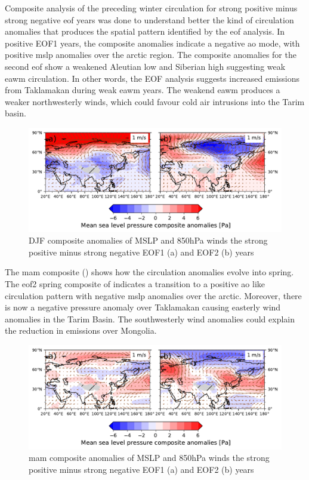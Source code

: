 Composite analysis of the preceding winter circulation for strong positive minus strong negative \acrshort{eof} years was done to understand better the kind of circulation anomalies that produces the spatial pattern identified by the \acrshort{eof} analysis. 
In positive EOF1 years, the composite anomalies indicate a negative \acrshort{ao} mode, with positive \acrshort{mslp} anomalies over the arctic region.
The composite anomalies for the second \acrshort{eof} show a weakened Aleutian low and Siberian high suggesting weak \acrshort{eawm} circulation.
In other words, the EOF analysis suggests increased emissions from Taklamakan during weak \acrshort{eawm} years. The weakend \acrshort{eawm} produces a weaker northwesterly winds, which could favour cold air intrusions into the Tarim basin.        
\begin{figure}[htpb]
    \centering
    \includegraphics[width=\textwidth]{texfiles/figs/EOF_emissions_composite.pdf}
    \caption{DJF composite anomalies of MSLP and 850hPa winds the strong positive minus strong negative  EOF1 (a) and EOF2 (b) years}
    \label{fig:eof_composite_DJF}
\end{figure}
The \acrshort{mam} composite () shows how the circulation anomalies evolve into spring. 
The \acrshort{eof}2 spring composite of indicates a transition to a positive \acrshort{ao} like circulation pattern with negative \acrshort{mslp} anomalies over the arctic. 
Moreover, there is now a negative pressure anomaly over Taklamakan causing easterly wind anomalies in the Tarim Basin.
The southwesterly wind anomalies could explain the reduction in emissions over Mongolia. 
\begin{figure}[htpb]
    \centering
    \includegraphics[width=\textwidth]{texfiles/figs/EOF_emissions_composite_MAM.pdf}
    \caption{\acrshort{mam} composite anomalies of MSLP and 850hPa winds the strong positive minus strong negative  EOF1 (a) and EOF2 (b) years}
    \label{fig:eof_composite_MAM}
\end{figure}

